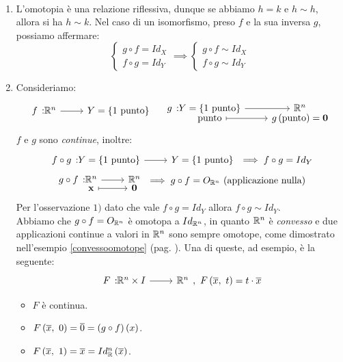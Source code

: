 \begin{demonstration}~{}
	\begin{enumerate}[label=\Roman*]
		\item L'omotopia è una relazione riflessiva, dunque se abbiamo $h=k$ e $h\sim h$, allora si ha $h\sim k$. Nel caso di un isomorfismo, preso $f$ e la sua inversa $g$, possiamo affermare:
		\begin{equation*}
			\begin{cases}
				g\circ f=Id_X\\
				f\circ g=Id_Y
			\end{cases}\implies
		\begin{cases}
			g\circ f\sim Id_X\\
			f\circ g\sim Id_Y
		\end{cases}
		\end{equation*}
	\item Consideriamo:
	\begin{equation}
		\funz{f}{\realset^n}{Y=\left\{1\text{ punto}\right\}}\quad\funztot{g}{Y=\left\{1\text{ punto}\right\}}{\realset^n}{\text{punto}}{g\left(\text{punto}\right)=\mathbf{0}}
	\end{equation}
$f$ e $g$ sono \textit{continue}, inoltre:
	\begin{gather*}
		\funz{f\circ g}{Y=\left\{1\text{ punto}\right\}}{Y=\left\{1\text{ punto}\right\}}\implies f\circ g= Id_Y\\
		\funztot{g\circ f}{\realset^n}{\realset^n}{\mathbf{x}}{\mathbf{0}}\implies g\circ f=O_{\realset^n}\ \text{(applicazione nulla)}
	\end{gather*}
Per l'osservazione $1)$ dato che vale $f\circ g= Id_Y$ allora $f\circ g\sim Id_Y$.\\
Abbiamo che $g\circ f=O_{\mathbb{R}^n}$ è omotopa a $Id_{\mathbb{R}^n}$, in quanto $\mathbb{R}^n$ è \textit{convesso} e due applicazioni continue a valori in $\mathbb{R}^n$ sono sempre omotope, come dimostrato nell'esempio \ref{convessoomotope} (pag. \pageref{convessoomotope}). Una di queste, ad esempio, è la seguente:
\begin{equation*}
\funz{F}{\realset^n\times I}{\realset^n},\ \mvf{F}{\overline{x}}{t}=t\cdot \overline{x}
\end{equation*}
\begin{itemize}
	\item $F$ è continua.
	\item $F\left(\overline{x},\ 0\right)=\overline{0}=\left(g\circ f\right)\left(x\right)$.
	\item $F\left(\overline{x},\ 1\right)=\overline{x}=Id_{\mathbb{R}}^n\left(\overline{x}\right)$.
\end{itemize}
\end{enumerate}
\vspace{-3mm}
\end{demonstration}
